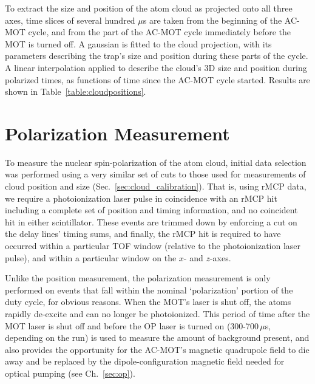 To extract the size and position of the atom cloud as projected onto all three axes, time slices of several hundred $\mu$s are taken from the beginning of the AC-MOT cycle, and from the part of the AC-MOT cycle immediately before the MOT is turned off.  A gaussian is fitted to the cloud projection, with its parameters describing the trap's size and position during these parts of the cycle.  A linear interpolation applied to describe the cloud's 3D size and position during polarized times, as functions of time since the AC-MOT cycle started.  Results are shown in Table~\ref{table:cloudpositions}.








\section{Polarization Measurement}
\label{sec:pol_meas}
To measure the nuclear spin-polarization of the atom cloud, initial data selection was performed using a very similar set of cuts to those used for measurements of cloud position and size (Sec.~\ref{sec:cloud_calibration}).  That is, using \ac{rMCP} data, we require a photoionization laser pulse in coincidence with an rMCP hit including a complete set of position and timing information, and no coincident hit in either scintillator.  These events are trimmed down by enforcing a cut on the delay lines' timing sums, and finally, the rMCP hit is required to have occurred within a particular \ac{TOF} window (relative to the photoionization laser pulse), and within a particular window on the $x$- and $z$-axes.

Unlike the position measurement, the polarization measurement is only performed on events that fall within the nominal `polarization' portion of the duty cycle, for obvious reasons.  When the MOT's laser is shut off, the atoms rapidly de-excite and can no longer be photoionized.  This period of time after the MOT laser is shut off and before the \ac{OP} laser is turned on (300-700$\,\mu$s, depending on the run) is used to measure the amount of background present, and also provides the opportunity for the AC-MOT's magnetic quadrupole field to die away and be replaced by the dipole-configuration magnetic field needed for optical pumping (see Ch.~\ref{sec:op}).  

